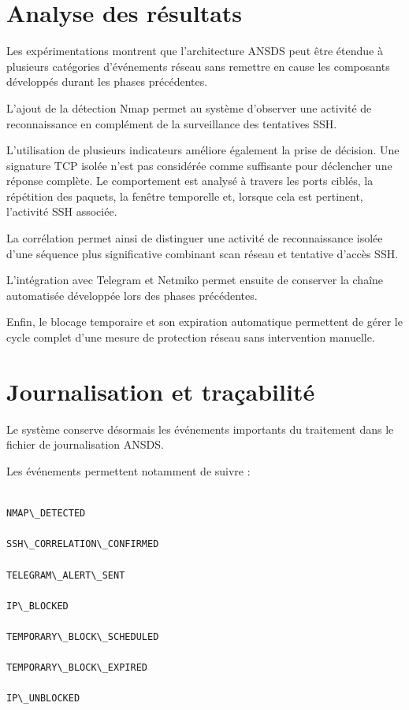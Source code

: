 \section{Analyse des résultats}

Les expérimentations montrent que l'architecture ANSDS peut être étendue à plusieurs catégories d'événements réseau sans remettre en cause les composants développés durant les phases précédentes.

L'ajout de la détection Nmap permet au système d'observer une activité de reconnaissance en complément de la surveillance des tentatives SSH.

L'utilisation de plusieurs indicateurs améliore également la prise de décision. Une signature TCP isolée n'est pas considérée comme suffisante pour déclencher une réponse complète. Le comportement est analysé à travers les ports ciblés, la répétition des paquets, la fenêtre temporelle et, lorsque cela est pertinent, l'activité SSH associée.

La corrélation permet ainsi de distinguer une activité de reconnaissance isolée d'une séquence plus significative combinant scan réseau et tentative d'accès SSH.

L'intégration avec Telegram et Netmiko permet ensuite de conserver la chaîne automatisée développée lors des phases précédentes.

Enfin, le blocage temporaire et son expiration automatique permettent de gérer le cycle complet d'une mesure de protection réseau sans intervention manuelle.

\section{Journalisation et traçabilité}

Le système conserve désormais les événements importants du traitement dans le fichier de journalisation ANSDS.

Les événements permettent notamment de suivre :

\begin{verbatim}

NMAP\_DETECTED

SSH\_CORRELATION\_CONFIRMED

TELEGRAM\_ALERT\_SENT

IP\_BLOCKED

TEMPORARY\_BLOCK\_SCHEDULED

TEMPORARY\_BLOCK\_EXPIRED

IP\_UNBLOCKED

\end{verbatim}

